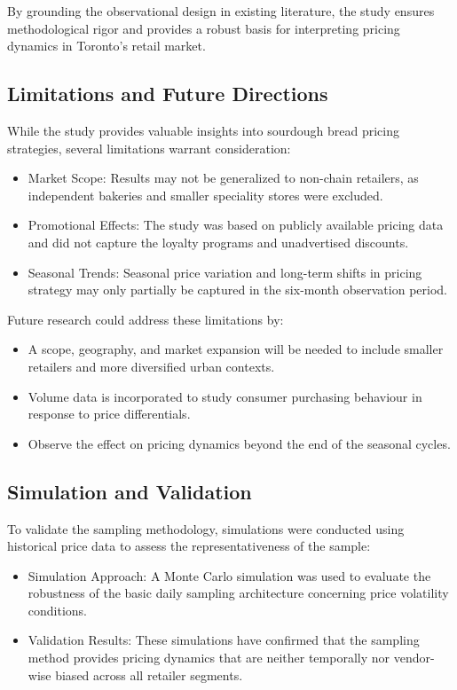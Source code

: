 \documentclass[
  letterpaper,
  DIV=11,
  numbers=noendperiod]{scrartcl}
\begin{document}
By grounding the observational design in existing literature, the study
ensures methodological rigor and provides a robust basis for
interpreting pricing dynamics in Toronto's retail market.

\subsection{Limitations and Future
Directions}\label{limitations-and-future-directions}

While the study provides valuable insights into sourdough bread pricing
strategies, several limitations warrant consideration:

\begin{itemize}
\item
  Market Scope: Results may not be generalized to non-chain retailers,
  as independent bakeries and smaller speciality stores were excluded.
\item
  Promotional Effects: The study was based on publicly available pricing
  data and did not capture the loyalty programs and unadvertised
  discounts.
\item
  Seasonal Trends: Seasonal price variation and long-term shifts in
  pricing strategy may only partially be captured in the six-month
  observation period.
\end{itemize}

Future research could address these limitations by:

\begin{itemize}
\item
  A scope, geography, and market expansion will be needed to include
  smaller retailers and more diversified urban contexts.
\item
  Volume data is incorporated to study consumer purchasing behaviour in
  response to price differentials.
\item
  Observe the effect on pricing dynamics beyond the end of the seasonal
  cycles.
\end{itemize}

\subsection{Simulation and Validation}\label{simulation-and-validation}

To validate the sampling methodology, simulations were conducted using
historical price data to assess the representativeness of the sample:

\begin{itemize}
\item
  Simulation Approach: A Monte Carlo simulation was used to evaluate the
  robustness of the basic daily sampling architecture concerning price
  volatility conditions.
\item
  Validation Results: These simulations have confirmed that the sampling
  method provides pricing dynamics that are neither temporally nor
  vendor-wise biased across all retailer segments.
\end{itemize}
\end{document}
